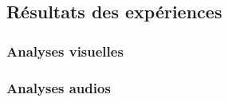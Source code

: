 \subsection{Résultats des expériences}

\subsubsection{Analyses visuelles}

\newpage

\subsubsection{Analyses audios}

